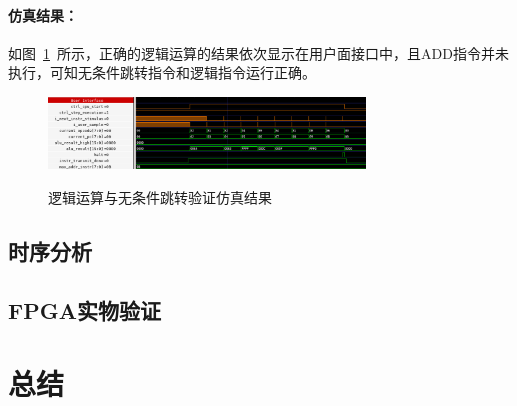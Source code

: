 \documentclass[lang=cn,a4paper,newtx]{elegantpaper}
\begin{document}
\paragraph{仿真结果：}
如图~\ref{fig:sim:4}~所示，正确的逻辑运算的结果依次显示在用户面接口中，且ADD指令并未执行，可知无条件跳转指令和逻辑指令运行正确。
\begin{figure}[htbp]
  \centering
  \caption{逻辑运算与无条件跳转验证仿真结果}
  \includegraphics[width = 0.75\textwidth]{figure/cpu_sim_logic.png}
  \label{fig:sim:4}
\end{figure}

\subsection{时序分析}

\subsection{FPGA实物验证}

\section{总结}
\end{document}
